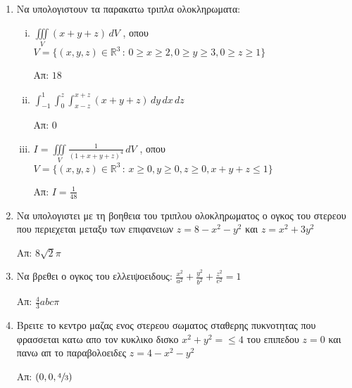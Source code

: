 


\thispagestyle{empty}
\everymath{\displaystyle}



\begin{center}
\end{center}

\vspace{\baselineskip}

\begin{enumerate}

\item Να υπολογιστουν τα παρακατω τριπλα ολοκληρωματα:

\begin{enumerate}[i)]

\item $\iiint\limits_{V}(x+y+z)\,dV$ , οπου $V=\{(x,y,z)\in\mathbb{R}^3\,:\, 0\geq x\geq 2, 0\geq y\geq 3, 0\geq z\geq 1\}$

\hfill Απ: $18$

\item $\int_{-1}^1\int_{0}^z\int_{x-z}^{x+z}(x+y+z)\,dy\,dx\,dz$

\hfill Απ: $0$

\item $I=\iiint\limits_{V}\frac{1}{(1+x+y+z)^4}\,dV$ , οπου $V=\{(x,y,z)\in \mathbb{R}^3\,:\, x\geq 0, y\geq 0, z\geq 0, x+y+z\leq 1\}$

\hfill Απ: $I=\frac{1}{48}$


\end{enumerate}

\item Να υπολογιστει με τη βοηθεια του τριπλου ολοκληρωματος ο ογκος του στερεου που περιεχεται μεταξυ των επιφανειων $z=8-x^2-y^2$ και $z=x^2+3y^2$

\hfill Απ: $8\sqrt{2}\pi$

\item Να βρεθει ο ογκος του ελλειψοειδους: $\frac{x^2}{a^2}+\frac{y^2}{b^2}+\frac{z^2}{c^2}=1$ 

\hfill Απ: $\frac{4}{3}abc\pi$

\item Βρειτε το κεντρο μαζας ενος στερεου σωματος σταθερης πυκνοτητας που φρασσεται κατω απο τον κυκλικο δισκο $x^2+y^2=\leq 4$ του επιπεδου $z=0$ και πανω απ το παραβολοειδες $z=4-x^2-y^2$

\hfill Απ: $(0,0,\sfrac{4}{3})$

\end{enumerate}



